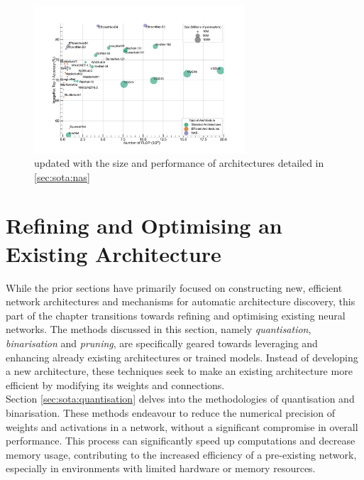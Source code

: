 \begin{figure}[htbp]
    \centering
    \includegraphics[width=0.70\textwidth]{chapter_sota/assets/network_sizes_normal_eff_nas.pdf}
    \caption{ updated with the size and
    performance of architectures detailed in \cref{sec:sota:nas}}
    \label{fig:sota:net_sizes_std_eff_nas}
\end{figure}


\section{Refining and Optimising an Existing Architecture}\label{sec:sota:refining_existing} 

While the prior sections have primarily focused on constructing new, efficient
network architectures and mechanisms for automatic architecture discovery, this
part of the chapter transitions towards refining and optimising existing neural
networks. The methods discussed in this section, namely \emph{quantisation},
\emph{binarisation} and \emph{pruning}, are specifically geared towards
leveraging and enhancing already existing architectures or trained models.
Instead of developing a new architecture, these techniques seek to make an
existing architecture more efficient by modifying its weights and connections.\\

Section \cref{sec:sota:quantisation} delves into the methodologies of
quantisation and binarisation. These methods endeavour to reduce the numerical
precision of weights and activations in a network, without a significant
compromise in overall performance. This process can significantly speed up
computations and decrease memory usage, contributing to the increased efficiency
of a pre-existing network, especially in environments with limited hardware or
memory resources.\\

